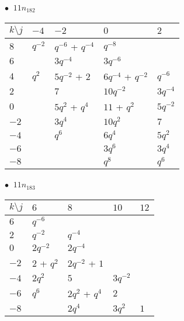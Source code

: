 %
\begin{minipage}{\linewidth}
$\bullet\ $ $11n_{182}$ \vspace{0.5em} \\
\begin{tabular}{l|llll}
$k \setminus j$ & $-4$ & $-2$ & $0$ & $2$ \\
\hline
$8$ & $q^{-2}$ & $q^{-6}$ + $q^{-4}$ & $q^{-8}$ &  \\
$6$ &  & $3q^{-4}$ & $3q^{-6}$ &  \\
$4$ & $q^{2}$ & $5q^{-2}$ + $2$ & $6q^{-4}$ + $q^{-2}$ & $q^{-6}$ \\
$2$ &  & $7$ & $10q^{-2}$ & $3q^{-4}$ \\
$0$ &  & $5q^{2}$ + $q^{4}$ & $11$ + $q^{2}$ & $5q^{-2}$ \\
$-2$ &  & $3q^{4}$ & $10q^{2}$ & $7$ \\
$-4$ &  & $q^{6}$ & $6q^{4}$ & $5q^{2}$ \\
$-6$ &  &  & $3q^{6}$ & $3q^{4}$ \\
$-8$ &  &  & $q^{8}$ & $q^{6}$ \\
\end{tabular}
\vspace{2em}
\end{minipage}
%
\begin{minipage}{\linewidth}
$\bullet\ $ $11n_{183}$ \vspace{0.5em} \\
\begin{tabular}{l|llll}
$k \setminus j$ & $6$ & $8$ & $10$ & $12$ \\
\hline
$6$ & $q^{-6}$ &  &  &  \\
$2$ & $q^{-2}$ & $q^{-4}$ &  &  \\
$0$ & $2q^{-2}$ & $2q^{-4}$ &  &  \\
$-2$ & $2$ + $q^{2}$ & $2q^{-2}$ + $1$ &  &  \\
$-4$ & $2q^{2}$ & $5$ & $3q^{-2}$ &  \\
$-6$ & $q^{6}$ & $2q^{2}$ + $q^{4}$ & $2$ &  \\
$-8$ &  & $2q^{4}$ & $3q^{2}$ & $1$ \\
\end{tabular}
\vspace{2em}
\end{minipage}
%
